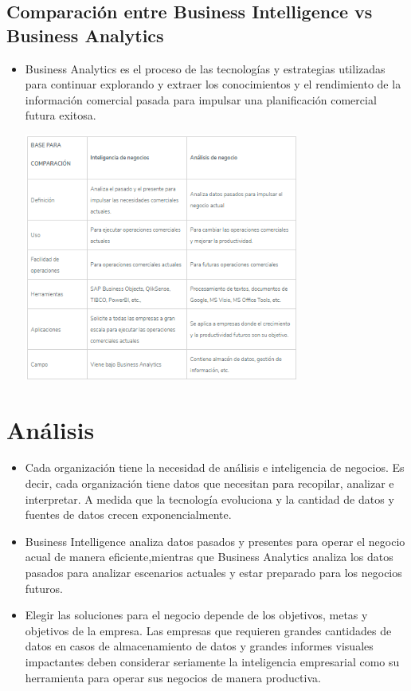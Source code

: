 \documentclass[%
 reprint,
 amsmath,amssymb,
 aps,
]{revtex4-1}
\begin{document}
\subsection{Comparación entre Business Intelligence vs Business Analytics}
  \begin{itemize}
		\item Business Analytics es el proceso de las tecnologías y estrategias utilizadas para continuar explorando y extraer los conocimientos y el rendimiento de la información comercial pasada para impulsar una planificación comercial futura exitosa.\cite{Educba}
\begin{center}
		\includegraphics[width=9cm]{./Imagenes/3}
		\end{center}
	           \end{itemize}
\section{Análisis}\label{sec:3}
	\begin{itemize}
		\item Cada organización tiene la necesidad de análisis e inteligencia de negocios. Es decir, cada organización tiene datos que necesitan para recopilar, analizar e interpretar. A medida que la tecnología evoluciona y la cantidad de datos y fuentes de datos crecen exponencialmente.
		\item Business Intelligence analiza datos pasados y presentes para operar el negocio acual de manera eficiente,mientras que Business Analytics analiza los datos pasados para analizar escenarios actuales y estar preparado para los negocios futuros.

                     \item Elegir las soluciones para el negocio depende de los objetivos, metas y objetivos de la empresa. Las empresas que requieren grandes cantidades de datos en casos de almacenamiento de datos y grandes informes visuales impactantes deben considerar seriamente la inteligencia empresarial como su herramienta para operar sus negocios de manera productiva.
	\end{itemize}
\end{document}
